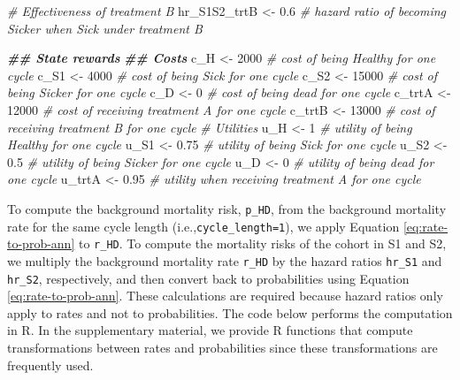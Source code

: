 \documentclass[
]{article}
\newenvironment{Shaded}{\begin{snugshade}}{\end{snugshade}}
\newcommand{\CommentTok}[1]{\textcolor[rgb]{0.56,0.35,0.01}{\textit{#1}}}
\newcommand{\DecValTok}[1]{\textcolor[rgb]{0.00,0.00,0.81}{#1}}
\newcommand{\DocumentationTok}[1]{\textcolor[rgb]{0.56,0.35,0.01}{\textbf{\textit{#1}}}}
\newcommand{\FloatTok}[1]{\textcolor[rgb]{0.00,0.00,0.81}{#1}}
\newcommand{\NormalTok}[1]{#1}
\newcommand{\OtherTok}[1]{\textcolor[rgb]{0.56,0.35,0.01}{#1}}
\begin{document}
\begin{Shaded}
\begin{Highlighting}[]
\CommentTok{\# Effectiveness of treatment B}
\NormalTok{hr\_S1S2\_trtB }\OtherTok{\textless{}{-}} \FloatTok{0.6} \CommentTok{\# hazard ratio of becoming Sicker when Sick under treatment B}

\DocumentationTok{\#\# State rewards}
\DocumentationTok{\#\# Costs}
\NormalTok{c\_H    }\OtherTok{\textless{}{-}} \DecValTok{2000}  \CommentTok{\# cost of being Healthy for one cycle }
\NormalTok{c\_S1   }\OtherTok{\textless{}{-}} \DecValTok{4000}  \CommentTok{\# cost of being Sick for one cycle }
\NormalTok{c\_S2   }\OtherTok{\textless{}{-}} \DecValTok{15000} \CommentTok{\# cost of being Sicker for one cycle}
\NormalTok{c\_D    }\OtherTok{\textless{}{-}} \DecValTok{0}     \CommentTok{\# cost of being dead for one cycle}
\NormalTok{c\_trtA }\OtherTok{\textless{}{-}} \DecValTok{12000} \CommentTok{\# cost of receiving treatment A for one cycle}
\NormalTok{c\_trtB }\OtherTok{\textless{}{-}} \DecValTok{13000} \CommentTok{\# cost of receiving treatment B for one cycle }
\CommentTok{\# Utilities}
\NormalTok{u\_H    }\OtherTok{\textless{}{-}} \DecValTok{1}     \CommentTok{\# utility of being Healthy for one cycle }
\NormalTok{u\_S1   }\OtherTok{\textless{}{-}} \FloatTok{0.75}  \CommentTok{\# utility of being Sick for one cycle }
\NormalTok{u\_S2   }\OtherTok{\textless{}{-}} \FloatTok{0.5}   \CommentTok{\# utility of being Sicker for one cycle}
\NormalTok{u\_D    }\OtherTok{\textless{}{-}} \DecValTok{0}     \CommentTok{\# utility of being dead for one cycle}
\NormalTok{u\_trtA }\OtherTok{\textless{}{-}} \FloatTok{0.95}  \CommentTok{\# utility when receiving treatment A for one cycle}
\end{Highlighting}
\end{Shaded}

To compute the background mortality risk, \texttt{p\_HD}, from the background mortality rate for the same cycle length (i.e.,\texttt{cycle\_length=1}), we apply Equation \eqref{eq:rate-to-prob-ann} to \texttt{r\_HD}. To compute the mortality risks of the cohort in S1 and S2, we multiply the background mortality rate \texttt{r\_HD} by the hazard ratios \texttt{hr\_S1} and \texttt{hr\_S2}, respectively, and then convert back to probabilities using Equation \eqref{eq:rate-to-prob-ann}. These calculations are required because hazard ratios only apply to rates and not to probabilities. The code below performs the computation in R. In the supplementary material, we provide R functions that compute transformations between rates and probabilities since these transformations are frequently used.
\end{document}
